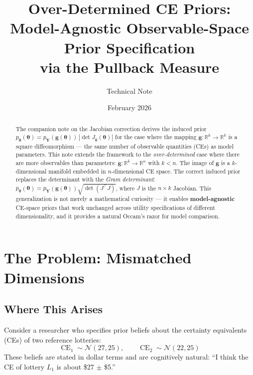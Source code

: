 \documentclass[11pt,a4paper]{article}
\title{Over-Determined CE Priors:\\
Model-Agnostic Observable-Space Prior Specification\\
via the Pullback Measure}
\author{Technical Note}
\date{February 2026}
\theoremstyle{definition}
\newcommand{\Normal}{\mathcal{N}}
\newcommand{\btheta}{\boldsymbol{\theta}}
\DeclareMathOperator{\CE}{CE}
\begin{document}
\maketitle

\begin{abstract}
The companion note on the Jacobian correction derives the induced prior
$p_{\btheta}(\btheta) = p_{\mathbf{Y}}(\mathbf{g}(\btheta)) \, |\!\det
J_{\mathbf{g}}(\btheta)|$ for the case where the mapping
$\mathbf{g}: \mathbb{R}^k \to \mathbb{R}^k$ is a square diffeomorphism ---
the same number of observable quantities (CEs) as model parameters. This note
extends the framework to the \emph{over-determined} case where there are more
observables than parameters: $\mathbf{g}: \mathbb{R}^k \to \mathbb{R}^n$
with $k < n$. The image of $\mathbf{g}$ is a $k$-dimensional manifold
embedded in $n$-dimensional CE space. The correct induced prior replaces the
determinant with the \emph{Gram determinant}:
$p_{\btheta}(\btheta) = p_{\mathbf{Y}}(\mathbf{g}(\btheta))
\sqrt{\det(J^\top\! J)}$, where $J$ is the $n \times k$ Jacobian. This
generalization is not merely a mathematical curiosity --- it enables
\textbf{model-agnostic} CE-space priors that work unchanged across utility
specifications of different dimensionality, and it provides a natural
Occam's razor for model comparison.
\end{abstract}

\tableofcontents
\newpage


\section{The Problem: Mismatched Dimensions}
\label{sec:problem}

\subsection{Where This Arises}

Consider a researcher who specifies prior beliefs about the certainty
equivalents (CEs) of two reference lotteries:
\begin{equation}
    \CE_1 \sim \Normal(27, 25), \qquad \CE_2 \sim \Normal(22, 25)
\end{equation}
These beliefs are stated in dollar terms and are cognitively natural: ``I think
the CE of lottery $L_1$ is about \$27 $\pm$ \$5.''
\end{document}
